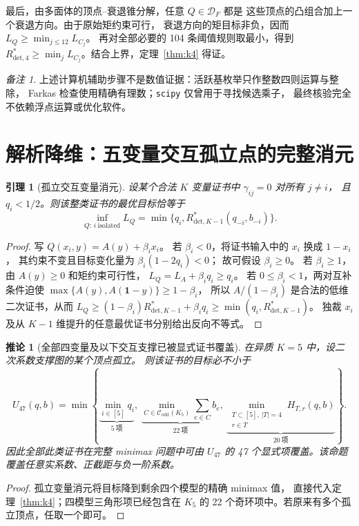 \documentclass[11pt,a4paper]{ctexart}
\newtheorem{lemma}[theorem]{引理}
\newtheorem{corollary}[theorem]{推论}
\theoremstyle{remark}\newtheorem{remark}[theorem]{备注}
\newcommand{\Rstar}[1]{R^*_{\mathrm{det},#1}}
\newcommand{\odd}{\mathcal C_{\mathrm{odd}}}
\begin{document}
最后，由多面体的顶点--衰退锥分解，任意 $Q\in\mathcal D_F$ 都是
这些顶点的凸组合加上一个衰退方向。由于原始矩约束可行，
衰退方向的矩目标非负，因而 $L_Q\ge\min_{j\le12}L_{C_j}$。
再对全部必要的 104 条阈值规则取最小，得到
$\Rstar{4}\ge\min_jL_{C_j}$。结合上界，定理~\ref{thm:k4} 得证。
\begin{remark}
上述计算机辅助步骤不是数值证据：活跃基枚举只作整数四则运算与整除，
Farkas 检查使用精确有理数；\texttt{scipy} 仅曾用于寻找候选乘子，
最终核验完全不依赖浮点运算或优化软件。
\end{remark}

\section{解析降维：五变量交互孤立点的完整消元}
\begin{lemma}[孤立交互变量消元]
设某个合法 $K$ 变量证书中 $\gamma_{ij}=0$ 对所有 $j\ne i$，
且 $q_i<1/2$。则该整类证书的最优目标恰等于
\begin{equation}\label{eq:isol}
\inf_{Q:\,i\ \mathrm{isolated}}L_Q
=\min\{q_i,\Rstar{K-1}(q_{-i},b_{-i})\}.
\end{equation}
\end{lemma}
\begin{proof}
写 $Q(x_i,y)=A(y)+\beta_i x_i$。
若 $\beta_i<0$，将证书输入中的 $x_i$ 换成 $1-x_i$，
其约束不变且目标变化量为 $\beta_i(1-2q_i)<0$；
故可假设 $\beta_i\ge0$。
若 $\beta_i\ge1$，由 $A(y)\ge0$ 和矩约束可行性，
$L_Q=L_A+\beta_iq_i\ge q_i$。
若 $0\le\beta_i<1$，两对互补条件迫使
$\max\{A(y),A(\mathbf1-y)\}\ge1-\beta_i$，
所以 $A/(1-\beta_i)$ 是合法的低维二次证书，从而
$L_Q\ge(1-\beta_i)\Rstar{K-1}+\beta_iq_i
\ge\min(q_i,\Rstar{K-1})$。
独裁 $x_i$ 及从 $K-1$ 维提升的任意最优证书分别给出反向不等式。
\end{proof}

\begin{corollary}[全部四变量及以下交互支撑已被显式证书覆盖]
在异质 $K=5$ 中，设二次系数支撑图的某个顶点孤立。
则该证书的目标必不小于
\[
U_{47}(q,b)=\min\left\{
\underbrace{\min_{i\in[5]}q_i}_{5\ \mathrm{项}},\ 
\underbrace{\min_{C\in\odd(K_5)}\sum_{e\in C}b_e}_{22\ \mathrm{项}},\
\underbrace{\min_{\substack{T\subset[5],\,|T|=4\\r\in T}}H_{T,r}(q,b)}_{20\ \mathrm{项}}
\right\}.
\]
因此全部此类证书在完整 minimax 问题中可由 $U_{47}$ 的
47 个显式项覆盖。该命题覆盖任意实系数、正截距与负一阶系数。
\end{corollary}
\begin{proof}
孤立变量消元将目标降到剩余四个模型的精确 minimax 值，
直接代入定理~\ref{thm:k4}；四模型三角形项已经包含在
$K_5$ 的 22 个奇环项中。若原来有多个孤立顶点，任取一个即可。
\end{proof}
\end{document}

